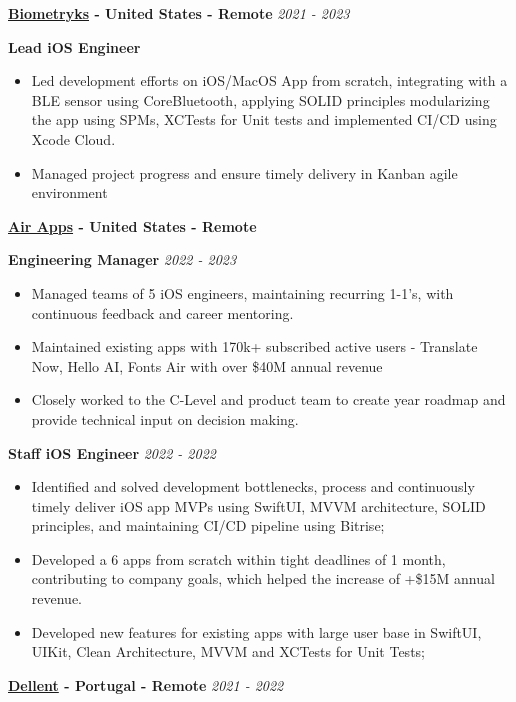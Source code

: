 \documentclass[11pt, oneside]{article}
\begin{document}
\textbf{\href{https://www.biometryks.com}{Biometryks} - United States - Remote}
\hfill
\textit{2021 - 2023}

\textbf{Lead iOS Engineer}

\begin{itemize}
    \item Led development efforts on iOS/MacOS App from scratch, integrating with a BLE sensor using CoreBluetooth, applying SOLID principles modularizing the app using SPMs, XCTests for Unit tests and implemented CI/CD using Xcode Cloud.
    \item Managed project progress and ensure timely delivery in Kanban agile environment
\end{itemize}

\textbf{\href{https://airapps.co}{Air Apps} - United States - Remote}

\textbf{Engineering Manager}
\hfill
\textit{2022 - 2023}

\begin{itemize}
    \item Managed teams of 5 iOS engineers, maintaining recurring 1-1’s, with continuous feedback and career mentoring. 
    \item Maintained existing apps with 170k+ subscribed active users - Translate Now, Hello AI, Fonts Air with over \$40M annual revenue
    \item Closely worked to the C-Level and product team to create year roadmap and provide technical input on decision making.
\end{itemize}

\textbf{Staff iOS Engineer}
\hfill
\textit{2022 - 2022}

\begin{itemize}
    \item Identified and solved development bottlenecks, process and continuously timely deliver iOS app MVPs using SwiftUI, MVVM architecture, SOLID principles, and maintaining CI/CD pipeline using Bitrise;
    \item Developed a 6 apps from scratch within tight deadlines of 1 month, contributing to company goals, which helped the increase of +\$15M annual revenue.
    \item Developed new features for existing apps with large user base in SwiftUI, UIKit, Clean Architecture, MVVM and XCTests for Unit Tests;
\end{itemize}

\textbf{\href{https://dellentconsulting.com}{Dellent} - Portugal - Remote}
\hfill
\textit{2021 - 2022}
\end{document}

